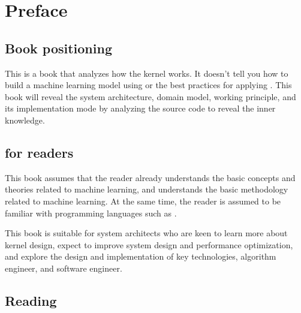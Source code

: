 \chapter{Preface} 
\label{ch:preface}

\section*{Book positioning}

\begin{content}

This is a book that analyzes how the  kernel works. It doesn't tell you how to build a machine learning model using  or the best practices for applying . This book will reveal the  system architecture, domain model, working principle, and its implementation mode by analyzing the  source code to reveal the inner knowledge.

\end{content}


\section*{for readers}

\begin{content}

This book assumes that the reader already understands the basic concepts and theories related to machine learning, and understands the basic methodology related to machine learning. At the same time, the reader is assumed to be familiar with programming languages ​​such as .

This book is suitable for system architects who are keen to learn more about  kernel design, expect to improve  system design and performance optimization, and explore the design and implementation of  key technologies,  algorithm engineer, and  software engineer.

\end{content}

\section*{Reading}

